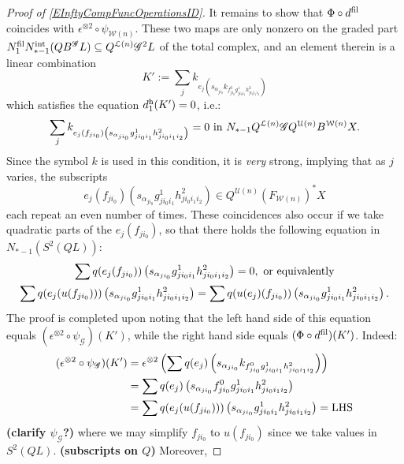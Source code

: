 \documentclass[11pt]{amsart}
\theoremstyle{plain}
\theoremstyle{definition}
\newcommand{\scrG}{\mathscr{G}}
\newcommand{\calW}{\mathcal{W}}
\newcommand{\calU}{\mathcal{U}}
\newcommand{\calL}{\mathcal{L}}
\theoremstyle{plain}
\newcommand{\BSW}{{\scrG}}
\newcommand{\BSWres}{B^\BSW}%
\begin{document}
\begin{Composite functor spectral sequences}
\begin{tricky proofs of operation compatibilities}
\begin{proof}[Proof of \ref{EInftyCompFuncOperationsID}]
It remains to show that $\Phi\circ d^\textup{fil}$ coincides with $\epsilon^{\otimes 2}\circ\psi_{\calW(n)}$. These two maps are only nonzero on the graded part $N_1^\textup{fil}N_{*-1}^\textup{int}(Q\BSWres L)\subseteq Q^{\calL(n)}\BSW^2 L$ of the total complex, and an element therein is a linear combination
\[K':=\sum_j k_{e_j\left(s_{\alpha_{ji_0}} k_{f^0_{ji_0}g^1_{ji_0i_1}h^2_{ji_0i_1i_2}}\right)}\]
which satisfies the equation $d_1^\textup{h}(K')=0$, i.e.:
\[\sum_j k_{e_j(f_{ji_0})\left(s_{\alpha_{ji_0}} {g^1_{ji_0i_1}h^2_{ji_0i_1i_2}}\right)}=0\textup{ in }N_{*-1}Q^{\calL(n)}\BSW Q^{\calU(n)}B^{\calW(n)}X.\]
Since the symbol $k$ is used in this condition, it is \emph{very} strong, implying that as $j$ varies, the subscripts 
\[e_j(f_{ji_0})\left(s_{\alpha_{ji_0}} {g^1_{ji_0i_1}h^2_{ji_0i_1i_2}}\right)\in Q^{\calU(n)}(F_{\calW(n)})^*X\]
each repeat an even number of times. %
These coincidences also occur if we take quadratic parts of the $e_j(f_{ji_0})$, so that there holds the following equation in $N_{*-1}(S^2(QL))$:
\begin{gather*}
\sum q(e_j(f_{ji_0}))\left(s_{\alpha_{ji_0}} {g^1_{ji_0i_1}h^2_{ji_0i_1i_2}}\right)=0,\textup{ or equivalently}\\
\sum q(e_j(u(f_{ji_0})))\left(s_{\alpha_{ji_0}} {g^1_{ji_0i_1}h^2_{ji_0i_1i_2}}\right)
=
\sum q(u(e_j)(f_{ji_0}))\left(s_{\alpha_{ji_0}} {g^1_{ji_0i_1}h^2_{ji_0i_1i_2}}\right).
\end{gather*}
The proof is completed upon noting that the left hand side of this equation equals $(\epsilon^{\otimes 2}\circ \psi_{\BSW})(K')$, while the right hand side equals $(\Phi\circ d^\textup{fil})(K')$. Indeed:
\begin{alignat*}{2}
(\epsilon^{\otimes 2}\circ \psi_{\BSW})(K')
&=
\epsilon^{\otimes 2}\left(\sum q(e_j)\left(s_{\alpha_{ji_0}} k_{f^0_{ji_0}g^1_{ji_0i_1}h^2_{ji_0i_1i_2}}\right)\right)%
\\
&=
\sum q(e_j)\left(s_{\alpha_{ji_0}} f^0_{ji_0}g^1_{ji_0i_1}h^2_{ji_0i_1i_2}\right)%
\\
&=
\sum q(e_j(u(f_{ji_0})))\left(s_{\alpha_{ji_0}} g^1_{ji_0i_1}h^2_{ji_0i_1i_2}\right)=\textup{LHS}
\end{alignat*}
\textbf{(clarify $\psi_{\BSW}$?)} where we may simplify $f_{ji_0}$ to $u(f_{ji_0})$ since we take values in $S^2(QL)$. \textbf{(subscripts on $Q$)} Moreover,

\end{proof}
\end{tricky proofs of operation compatibilities}
\end{Composite functor spectral sequences}
\end{document}
